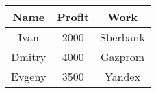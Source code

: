 \documentclass{article}
\begin{document}
\begin{center}
\begin{tabular}{ |c|c|c| } 
 \hline
 Name & Profit & Work \\
 \hline
 Ivan & 2000 & Sberbank \\
 \hline
 Dmitry & 4000 & Gazprom \\
 \hline
 Evgeny & 3500 & Yandex \\
 \hline
\end{tabular}
\end{center}
\end{document}
